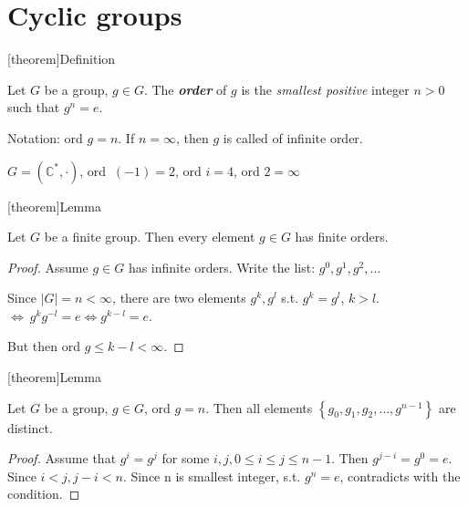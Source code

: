 \documentclass[12pt]{report}
\theoremstyle{definition}
\begin{document}
\section{Cyclic groups}

[theorem]{Definition}
\begin{cyclic groups}
    Let $G$ be a group, $g \in G$. The \textbf{\emph{order}} of $g$ is the \emph{smallest positive} integer $n > 0$ %
    such that $g^{n} = e$.

    Notation: ord $g = n$. If $n = \infty$, then $g$ is called of infinite order.
\end{cyclic groups}

\begin{ex}
    $G = (\mathbb{C}^{*}, \cdot)$, ord $\ (-1) = 2$, ord $i = 4$, ord $2 = \infty$
\end{ex}

[theorem]{Lemma}
\begin{finite cyclic group}
    Let $G$ be a finite group. Then every element $g \in G$ has finite orders.%
\end{finite cyclic group}

\begin{proof}
    Assume $g \in G$ has infinite orders. %
    Write the list: $g^{0}, g^{1}, g^{2}, \ldots$

    Since $|G| = n < \infty$, there are two elements 
    $g^{k}, g^{l}$ s.t. $g^{k} = g^{l}$, $k > l$.
    $\iff\ g^{k} g^{-l} = e \iff g^{k - l} = e$.%

    But then ord $g \le k - l < \infty$.%
\end{proof}

[theorem]{Lemma}
\begin{distinct element in a group}
    Let $G$ be a group, $g \in G$, ord $g = n$. %
    Then all elements $\left\{g_0, g_1, g_2, \ldots, g^{n-1}\right\} $ are distinct.
\end{distinct element in a group}

\begin{proof}
    Assume that $g^{i} = g^{j}$ for some $i, j, 0 \le i \le j \le n - 1$. %
    Then $g^{j-i} = g^0 = e$. Since $i < j, {j-i} < n$. Since n is smallest integer, s.t. $g^{n} = e$,
    contradicts with the condition.
\end{proof}
\end{document}
